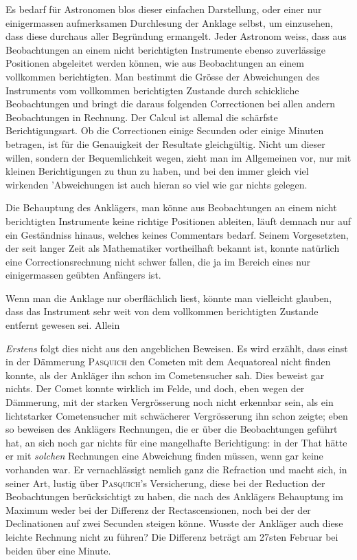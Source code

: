 Es bedarf für Astronomen blos dieser einfachen Darstellung, oder einer nur einigermassen aufmerksamen Durchlesung der Anklage selbst, um einzusehen, dass diese durchaus aller Begründung ermangelt. Jeder Astronom weiss, dass aus Beobachtungen an einem nicht berichtigten Instrumente ebenso zuverlässige Positionen abgeleitet werden können, wie aus Beobachtungen an einem vollkommen berichtigten. Man bestimmt die Grösse der Abweichungen des Instruments vom vollkommen berichtigten Zustande durch schickliche Beobachtungen und bringt die daraus folgenden Correctionen bei allen andern Beobachtungen in Rechnung. Der Calcul ist allemal die schärfste Berichtigungsart. Ob die  Correctionen einige Secunden oder einige Minuten betragen, ist für die Genauigkeit der Resultate gleichgültig. Nicht um dieser willen, sondern der Bequemlichkeit wegen, zieht man im Allgemeinen vor, nur mit kleinen Berichtigungen zu thun zu haben, und bei den immer gleich viel wirkenden 'Abweichungen ist auch hieran so viel wie gar nichts gelegen.

Die Behauptung des Anklägers, man könne aus Beobachtungen an einem nicht berichtigten Instrumente keine richtige Positionen ableiten, läuft demnach nur auf ein Geständniss hinaus, welches keines Commentars bedarf. Seinem Vorgesetzten, der seit langer Zeit als Mathematiker vortheilhaft bekannt ist, konnte natürlich eine Correctionsrechnung nicht schwer fallen, die ja im Bereich eines nur einigermassen geübten Anfängers ist.

Wenn man die Anklage nur oberflächlich liest, könnte man vielleicht glauben, dass das Instrument sehr weit von dem vollkommen berichtigten Zustande entfernt gewesen sei. Allein

\emph{Erstens} folgt dies nicht aus den angeblichen Beweisen. Es wird erzählt, dass einst in der Dämmerung \textsc{Pasquich} den Cometen mit dem Aequatoreal nicht finden konnte, als der Ankläger ihn schon im Cometensucher sah. Dies beweist gar nichts. Der Comet konnte wirklich im Felde, und doch, eben wegen der Dämmerung, mit der starken Vergrösserung noch nicht erkennbar sein, als ein lichtstarker Cometensucher mit schwächerer Vergrösserung ihn schon zeigte; eben so beweisen des Anklägers Rechnungen, die er über die Beobachtungen geführt hat, an sich noch gar nichts für eine mangelhafte Berichtigung: in der That hätte er mit \emph{solchen} Rechnungen eine Abweichung finden müssen, wenn gar keine vorhanden war. Er vernachlässigt nemlich ganz die Refraction und macht sich, in seiner Art, lustig über \textsc{Pasquich}'s Versicherung, diese bei der Reduction der Beobachtungen berücksichtigt zu haben, die nach des Anklägers Behauptung im Maximum weder bei der Differenz der Rectascensionen, noch bei der der Declinationen auf zwei Secunden steigen könne. Wusste der Ankläger auch diese leichte Rechnung nicht zu führen? Die Differenz beträgt am 27sten Februar bei beiden über eine Minute.

